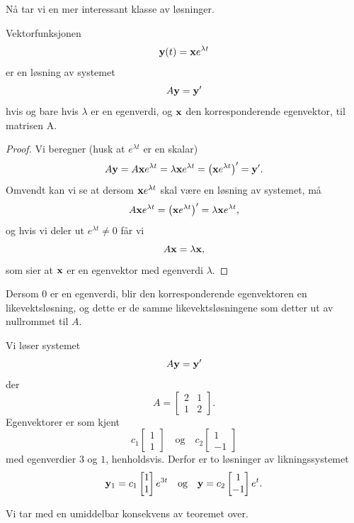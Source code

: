 Nå tar vi en mer interessant klasse av løsninger.

\begin{thm}
Vektorfunksjonen
\[
\mathbf{y}(t)=
\mathbf{x} e^{\lambda t}
\]
er en løsning av systemet 
\[
A\mathbf{y}=\mathbf{y}'
\]
hvis og bare hvis $\lambda$ er en egenverdi, og $\mathbf{x}$ den korresponderende egenvektor, til matrisen A. 
\end{thm}
\begin{proof}
Vi beregner (husk at $e^{\lambda t}$ er en skalar)
\[
A\mathbf{y}=A\mathbf{x} e^{\lambda t}=\lambda \mathbf{x} e^{\lambda t} = \left(\mathbf{x} e^{\lambda t}\right)'=\mathbf{y}'.
\]
Omvendt kan vi se at dersom $\mathbf{x} e^{\lambda t}$ skal være en løsning av systemet, må 
\[
A\V x e^{\lambda t}=\left(\V x e^{\lambda t}\right)'=\lambda \V x e^{\lambda t}, %
\]
og hvis vi deler ut  $e^{\lambda t}\neq 0$ får vi
\[
A\V x = \lambda \V x, %
\] 
som sier at $\mathbf{x}$ er en egenvektor med egenverdi $\lambda$.
\end{proof}


\begin{merkx}
Dersom 0 er en egenverdi, blir den korresponderende egenvektoren en likevektsløsning,
og dette er de samme likevektsløsningene som detter ut av nullrommet til $A$.
\end{merkx}


\begin{ex}
Vi løser systemet 
\[
A\mathbf{y}=\mathbf{y}'
\]
der 
\[
A=
\begin{bmatrix}
2 & 1  \\
1 & 2 
\end{bmatrix}.
\]
Egenvektorer er som kjent 
\[
c_1
\begin{bmatrix}
1  \\
1 
\end{bmatrix}
\quad \text{og} \quad
c_2
\begin{bmatrix}
1  \\
-1 
\end{bmatrix}
\]
med egenverdier $3$ og $1$, henholdsvis. Derfor er to løsninger av likningssystemet
\[
\mathbf{y}_1=
c_1
\begin{bmatrix}
1  \\
1 
\end{bmatrix} e^{3t}
\quad \text{og} \quad
\mathbf{y}=
c_2
\begin{bmatrix}
1  \\
-1 
\end{bmatrix}e^{t}. \qedhere
\]
\end{ex}


Vi tar med en umiddelbar konsekvens av teoremet over.

